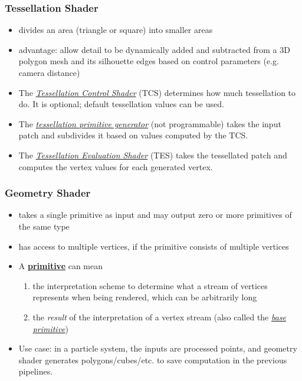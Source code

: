 \documentclass[twocolumn,landscape,10pt]{article}
\theoremstyle{definition}
\begin{document}
\subsubsection{Tessellation Shader}
\begin{itemize}
    \item divides an area (triangle or square) into smaller areas
    \item advantage: allow detail to be dynamically added and subtracted
        from a 3D polygon mesh and its silhouette edges based on control
        parameters (e.g. camera distance)
    \item The \underline{\emph{Tessellation Control Shader}} (TCS) determines
        how much tessellation to do. It is optional; default
        tessellation values can be used.
    \item The \underline{\emph{tessellation primitive generator}} 
        (not programmable) takes the input patch 
        and subdivides it based on values computed by the TCS.
    \item The \underline{\emph{Tessellation Evaluation Shader}} (TES) takes the
        tessellated patch and computes the vertex values for each
        generated vertex.
\end{itemize} 

\subsubsection{Geometry Shader}
\begin{itemize}
    \item takes a single primitive as input and may output zero or more
        primitives of the same type
    \item has access to multiple vertices, if the primitive consists of multiple
        vertices
    \item A \underline{\textbf{primitive}} can mean
        \begin{enumerate}[label = (\alph*)]
            \item the interpretation scheme to determine what a stream
                of vertices represents when being rendered,
                which can be arbitrarily long
            \item the \emph{result} of the interpretation of a vertex
                stream (also called the \underline{\emph{base primitive}})
        \end{enumerate} 
    \item Use case: in a particle system, the inputs are processed
        points, and geometry shader generates polygons/cubes/etc. to
        save computation in the previous pipelines.
\end{itemize} 
\end{document}
